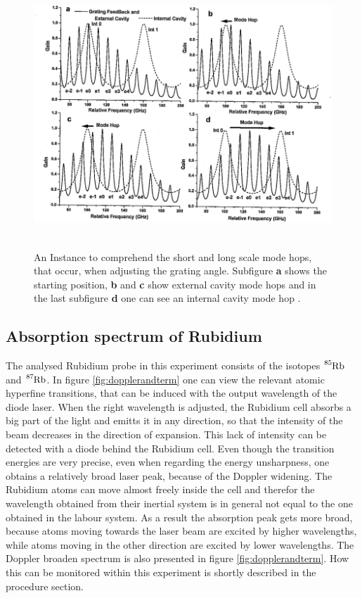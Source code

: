 \begin{figure}
  \centering
  \includegraphics[height=10cm]{Ordnername/continter}
  \caption{An Instance to comprehend the short and long scale mode hops, that occur, when adjusting the grating angle.
  Subfigure \textbf{a} shows the starting position, \textbf{b} and \textbf{c} show external cavity mode hops and in the
  last subfigure \textbf{d} one can see an internal cavity mode hop \cite{manual}.}
  \label{fig:continter}
\end{figure}

\subsection{Absorption spectrum of Rubidium}

The analysed Rubidium probe in this experiment consists of the isotopes $\ce{^{85}Rb}$ and $\ce{^{87}Rb}$.
In figure \ref{fig:dopplerandterm} one can view the relevant atomic hyperfine transitions, that can be induced
with the output wavelength of the diode laser. When the right wavelength is adjusted, the Rubidium cell
absorbs a big part of the light and emitts it in any direction, so that the intensity of the beam decreases
in the direction of expansion. This lack of intensity can be detected with a diode behind the Rubidium cell.
Even though the transition energies are very precise, even when regarding the energy unsharpness,
one obtains a relatively broad laser peak, because of the Doppler widening.
The Rubidium atoms can move almost freely inside the cell and therefor the wavelength obtained from their inertial system
is in general not equal to the one obtained in the labour system. As a result the absorption peak gets more broad, because atoms
moving towards the laser beam are excited by higher wavelengths, while atoms moving in the other direction are excited
by lower wavelengths. The Doppler broaden spectrum is also presented in figure \ref{fig:dopplerandterm}. How this can
be monitored within this experiment is shortly described in the procedure section.


